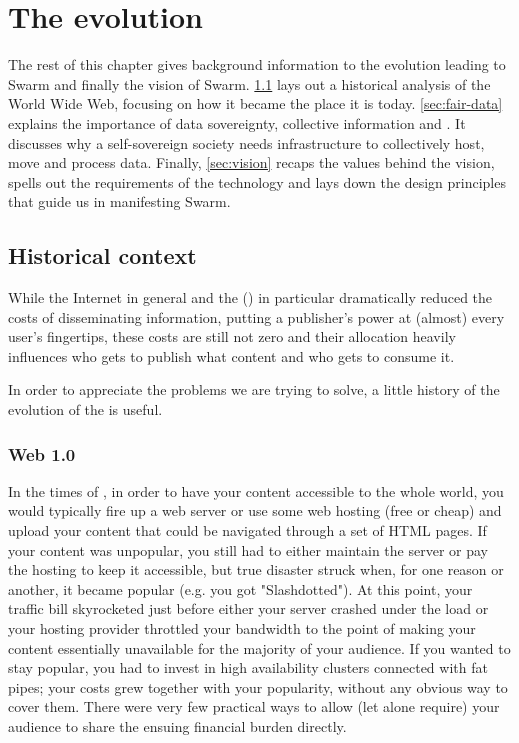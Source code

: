 \chapter{The evolution  \statusgreen}\label{chap:vision}



The rest of this chapter gives background information to the evolution leading to Swarm and finally the vision of Swarm. \ref{sec:historical_context} lays out a historical analysis of the World Wide Web, focusing on how it became the place it is today.
\ref{sec:fair-data} explains the importance of data sovereignty, collective information and . It discusses why a self-sovereign society needs infrastructure to collectively host, move and process data.
Finally, \ref{sec:vision} recaps the values behind the vision, spells out the requirements of the technology and lays down the design principles that guide us in manifesting Swarm.

\section{Historical context  \statusgreen}\label{sec:historical_context}
\green{}
While the Internet in general and the  () in particular dramatically reduced the costs of disseminating information, putting a publisher's power at (almost) every user's fingertips, these costs are still not zero and their allocation heavily influences who gets to publish what content and who gets to consume it.

In order to appreciate the problems we are trying to solve, a little history of the evolution of the  is useful.

\subsection{Web 1.0 \statusgreen}\label{sec:web_1}

In the times of , in order to have your content accessible to the whole world, you would typically fire up a web server or use some web hosting (free or cheap) and upload your content that could be navigated through a set of HTML pages. If your content was unpopular, you still had to either maintain the server or pay the hosting to keep it accessible, but true disaster struck when, for one reason or another, it became popular (e.g. you got "Slashdotted"). At this point, your traffic bill skyrocketed just before either your server crashed under the load or your hosting provider throttled your bandwidth to the point of making your content essentially unavailable for the majority of your audience. If you wanted to stay popular, you had to invest in high availability clusters connected with fat pipes; your costs grew together with your popularity, without any obvious way to cover them. There were very few practical ways to allow (let alone require) your audience to share the ensuing financial burden directly.

